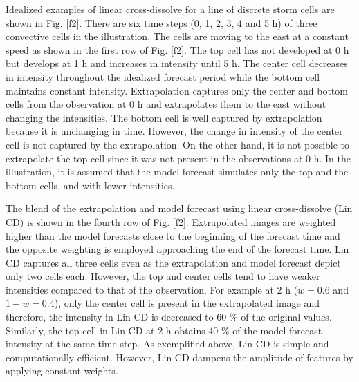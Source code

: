 \documentclass[12pt]{article}
\begin{document}
 Idealized examples of linear cross-dissolve for a line of discrete storm cells are shown in Fig. \ref{f2}. There are six time steps (0, 1, 2, 3, 4 and 5 h) of three convective cells in the illustration. The cells are moving to the east at a constant speed as shown in the first row of Fig. \ref{f2}. The top cell has not developed at 0 h but develops at 1 h and  increases in intensity until 5 h. The center cell decreases in intensity throughout the idealized forecast period while the bottom cell maintains constant intensity. Extrapolation captures only the center and bottom cells from the observation at 0 h and extrapolates them to the east without changing the intensities. The bottom cell is well captured by extrapolation because it is unchanging in time. However, the change in intensity of the center cell is not captured by the extrapolation. On the other hand, it is not possible to extrapolate the top cell since it was not present in the observations at 0 h. In the illustration, it is assumed that the model forecast simulates only the top and the bottom cells, and with lower intensities. 
 
 The blend of the extrapolation and model forecast using linear cross-dissolve (Lin CD) is shown in the fourth row of Fig. \ref{f2}. Extrapolated images are weighted higher than the model forecasts close to the beginning of the forecast time and the opposite weighting is employed approaching the end of the forecast time. Lin CD captures all three cells even as the extrapolation and model forecast depict only two cells each. However, the top and center cells tend to have weaker intensities compared to that of the observation. For example at 2 h ($w=0.6$ and $1-w=0.4$), only the center cell is present in the extrapolated image and therefore, the intensity in Lin CD is decreased to 60 \% of the original values. Similarly, the top cell in Lin CD at 2 h obtains 40 \% of the model forecast intensity at the same time step. As exemplified above, Lin CD is simple and computationally efficient.  However, Lin CD dampens the amplitude of features by applying constant weights.
\end{document}
